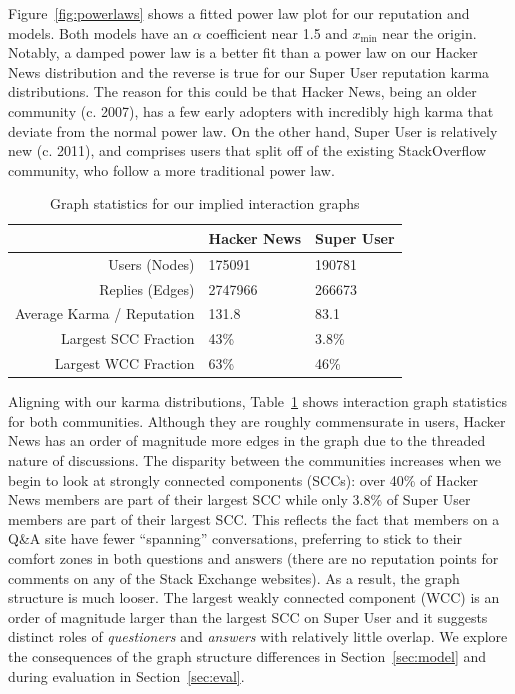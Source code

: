 \documentclass[11pt]{article}
\begin{document}
Figure~\ref{fig:powerlaws} shows a fitted power law plot for our reputation and
models. Both models have an $\alpha$ coefficient near 1.5 and $x_{\text{min}}$
near the origin. Notably, a damped power law is a better fit than a power law on
our Hacker News distribution and the reverse is true for our Super User
reputation karma distributions. The reason for this could be that Hacker News,
being an older community (c. 2007), has a few early adopters with incredibly
high karma that deviate from the normal power law. On the other hand, Super User
is relatively new (c. 2011), and comprises users that split off of the existing
StackOverflow community, who follow a more traditional power law.

\begin{table}[t]
\begin{center}
\begin{tabular}{| r | l l |}
\hline
& \textbf{Hacker News} & \textbf{Super User} \\
\hline
Users (Nodes) & 175091 & 190781 \\
Replies (Edges) & 2747966 & 266673 \\
Average Karma / Reputation & 131.8 & 83.1 \\
Largest SCC Fraction & 43\% & 3.8\% \\
Largest WCC Fraction & 63\% & 46\% \\
\hline
\end{tabular}
\end{center}
\caption{Graph statistics for our implied interaction graphs}
\label{tab:graphstats}
\end{table}

Aligning with our karma distributions, Table~\ref{tab:graphstats} shows
interaction graph statistics for both communities. Although they are roughly
commensurate in users, Hacker News has an order of magnitude more edges in the
graph due to the threaded nature of discussions. The disparity between the
communities increases when we begin to look at strongly connected components
(SCCs): over 40\% of Hacker News members are part of their largest SCC while
only 3.8\% of Super User members are part of their largest SCC\@. This reflects
the fact that members on a Q\&A site have fewer ``spanning'' conversations,
preferring to stick to their comfort zones in both questions and answers (there
are no reputation points for comments on any of the Stack Exchange websites). As
a result, the graph structure is much looser. The largest weakly connected
component (WCC) is an order of magnitude larger than the largest SCC on Super
User and it suggests distinct roles of \textit{questioners} and \textit{answers}
with relatively little overlap. We explore the consequences of the graph structure
differences in Section~\ref{sec:model} and during evaluation in Section~\ref{sec:eval}.
\end{document}

